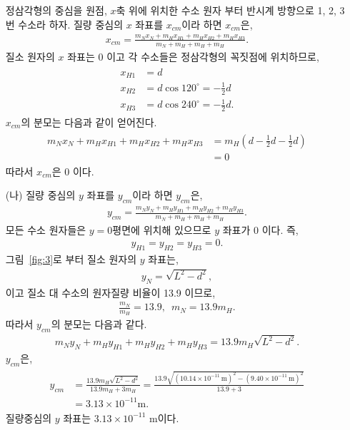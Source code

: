 \documentclass[floatfix,nofootinbib,superscriptaddress,fleqn]{revtex4-2}
\begin{document}
\begin{itemize}
  정삼각형의 중심을 원점, 
  $x$축 위에 위치한 수소 원자 부터 반시계 방향으로 1, 2, 3번 수소라 
  하자. 질량 중심의 $x$ 좌표를 $x_{cm}$이라 하면 $x_{cm}$은,
  \begin{align}
    x_{cm} = \frac{m_{N}x_{N} + m_{H}x_{H1} + m_{H}x_{H2} + m_{H}x_{H3}}
    {m_{N} + m_{H} + m_{H} + m_{H}}.
  \end{align}
  질소 원자의 $x$ 좌표는 0 이고 각 수소들은 정삼각형의 꼭짓점에 위치하므로,
  \begin{align}
    \begin{split}
      x_{H1} &= d  \\
      x_{H2} &= d\cos{120^\circ} =-\frac{1}{2}d \\
      x_{H3} &= d\cos{240^\circ} =-\frac{1}{2}d .
    \end{split}
  \end{align}
  $x_{cm}$의 분모는 다음과 같이 얻어진다.
  \begin{align}
    \begin{split}
      m_{N}x_{N} + m_{H}x_{H1} + m_{H}x_{H2} + m_{H}x_{H3}
      &=m_{H}\left(d -\frac{1}{2}d -\frac{1}{2}d\right) \\
      &=0
    \end{split}
  \end{align}
  따라서 $x_{cm}$은 0 이다.
  \item[(나)] 질량 중심의 $y$ 좌표를 $y_{cm}$이라 하면 $y_{cm}$은,
  \begin{align}
    y_{cm} = \frac{m_{N}y_{N} + m_{H}y_{H1} + m_{H}y_{H2} + m_{H}y_{H3}}
    {m_{N} + m_{H} + m_{H} + m_{H}}.
  \end{align}
  모든 수소 원자들은 $y=0$평면에 위치해 있으므로 $y$ 좌표가 0 이다. 즉,
  \begin{align}
    y_{H1}=y_{H2}=y_{H3}=0.
  \end{align}
  그림~\ref{fig:3}로 부터 질소 원자의 $y$ 좌표는,
  \begin{align}
    y_{N} = \sqrt{L^2-d^2},
  \end{align}
  이고 질소 대 수소의 원자질량 비율이 13.9 이므로,
  \begin{align}
    \frac{m_N}{m_H} = 13.9,\,\,\,m_{N}=13.9m_{H}.
  \end{align}
  따라서 $y_{cm}$의 분모는 다음과 같다.
  \begin{align}
    m_{N}y_{N} + m_{H}y_{H1} + m_{H}y_{H2} + m_{H}y_{H3}=
    13.9m_{H}\sqrt{L^2-d^2}.
  \end{align}
  $y_{cm}$은,
  \begin{align}
    \begin{split}
      y_{cm} &= \frac{13.9m_{H}\sqrt{L^2-d^2}}{13.9m_{H} + 3m_{H}}
      = \frac{13.9\sqrt{(10.14\times 10^{-11}\,\mathrm{m})^2
      -(9.40\times 10^{-11}\,\mathrm{m})^2}}{13.9 + 3}  \\
      &= 3.13\times10^{-11}\mathrm{m}.
    \end{split}
  \end{align}
  질량중심의 $y$ 좌표는 $3.13\times10^{-11}$ m이다.
\end{itemize}
\end{document}
